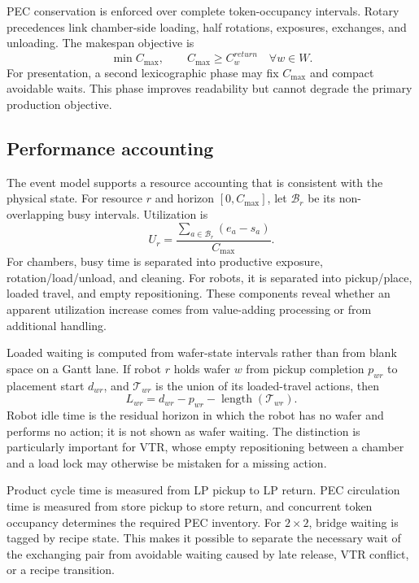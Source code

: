\documentclass[5p,times,procedia]{elsarticle}
\begin{document}
PEC conservation is enforced over complete token-occupancy intervals. Rotary precedences link chamber-side loading, half rotations, exposures, exchanges, and unloading. The makespan objective is
\begin{equation}
\min C_{\max},\qquad C_{\max}\ge C^{return}_w\quad \forall w\in W.
\label{eq:makespan}
\end{equation}
For presentation, a second lexicographic phase may fix $C_{\max}$ and compact avoidable waits. This phase improves readability but cannot degrade the primary production objective.

\subsection{Performance accounting}

The event model supports a resource accounting that is consistent with the physical state. For resource $r$ and horizon $[0,C_{\max}]$, let $\mathcal{B}_r$ be its non-overlapping busy intervals. Utilization is
\begin{equation}
U_r=\frac{\sum_{a\in\mathcal{B}_r}(e_a-s_a)}{C_{\max}}.
\label{eq:utilization}
\end{equation}
For chambers, busy time is separated into productive exposure, rotation/load/unload, and cleaning. For robots, it is separated into pickup/place, loaded travel, and empty repositioning. These components reveal whether an apparent utilization increase comes from value-adding processing or from additional handling.

Loaded waiting is computed from wafer-state intervals rather than from blank space on a Gantt lane. If robot $r$ holds wafer $w$ from pickup completion $p_{wr}$ to placement start $d_{wr}$, and $\mathcal{T}_{wr}$ is the union of its loaded-travel actions, then
\begin{equation}
L_{wr}=d_{wr}-p_{wr}-\operatorname{length}(\mathcal{T}_{wr}).
\label{eq:loadedwait}
\end{equation}
Robot idle time is the residual horizon in which the robot has no wafer and performs no action; it is not shown as wafer waiting. The distinction is particularly important for VTR, whose empty repositioning between a chamber and a load lock may otherwise be mistaken for a missing action.

Product cycle time is measured from LP pickup to LP return. PEC circulation time is measured from store pickup to store return, and concurrent token occupancy determines the required PEC inventory. For $2\times2$, bridge waiting is tagged by recipe state. This makes it possible to separate the necessary wait of the exchanging pair from avoidable waiting caused by late release, VTR conflict, or a recipe transition.
\end{document}
